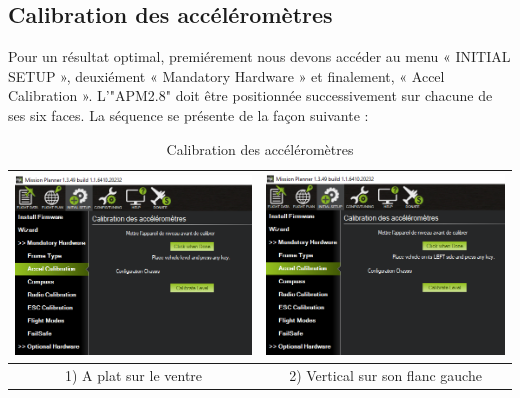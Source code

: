 	\subsection{Calibration des accéléromètres}
	Pour un résultat optimal,  premiérement nous devons accéder au menu « INITIAL SETUP », deuxiément « Mandatory Hardware » et finalement, « Accel Calibration ». L'"APM2.8" doit être positionnée successivement sur chacune de ses six faces.
	La séquence se présente de la façon suivante :
	\begin{table}[H]
		\begin{center}
			\caption{Calibration des accéléromètres  }
			
			\hspace*{-0.8 cm}	\begin{tabular}{|c|c|}
				\hline
				\centering
				\includegraphics[width=7.5cm]{Images/A plat sur le ventre} & \includegraphics[width=7.5cm]{Images/Vertical sur son flanc gauche}\\
				\hline
				\centering
				
				1) A plat sur le ventre & 2) Vertical sur son flanc gauche \\
				
				\hline
				

\end{tabular}
\end{center}
\end{table}
